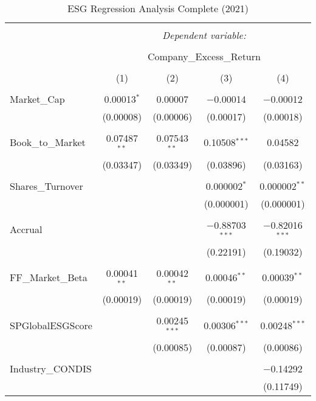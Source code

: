 
\begin{table}[!htbp] \centering 
  \caption{ESG Regression Analysis Complete (2021)} 
  \label{} 
\begin{tabular}{@{\extracolsep{5pt}}lcccc} 
\\[-1.8ex]\hline 
\hline \\[-1.8ex] 
 & \multicolumn{4}{c}{\textit{Dependent variable:}} \\ 
\cline{2-5} 
\\[-1.8ex] & \multicolumn{4}{c}{Company\_Excess\_Return} \\ 
\\[-1.8ex] & (1) & (2) & (3) & (4)\\ 
\hline \\[-1.8ex] 
 Market\_Cap & 0.00013$^{*}$ & 0.00007 & $-$0.00014 & $-$0.00012 \\ 
  & (0.00008) & (0.00006) & (0.00017) & (0.00018) \\ 
  & & & & \\ 
 Book\_to\_Market & 0.07487$^{**}$ & 0.07543$^{**}$ & 0.10508$^{***}$ & 0.04582 \\ 
  & (0.03347) & (0.03349) & (0.03896) & (0.03163) \\ 
  & & & & \\ 
 Shares\_Turnover &  &  & 0.000002$^{*}$ & 0.000002$^{**}$ \\ 
  &  &  & (0.000001) & (0.000001) \\ 
  & & & & \\ 
 Accrual &  &  & $-$0.88703$^{***}$ & $-$0.82016$^{***}$ \\ 
  &  &  & (0.22191) & (0.19032) \\ 
  & & & & \\ 
 FF\_Market\_Beta & 0.00041$^{**}$ & 0.00042$^{**}$ & 0.00046$^{**}$ & 0.00039$^{**}$ \\ 
  & (0.00019) & (0.00019) & (0.00019) & (0.00019) \\ 
  & & & & \\ 
 SPGlobalESGScore &  & 0.00245$^{***}$ & 0.00306$^{***}$ & 0.00248$^{***}$ \\ 
  &  & (0.00085) & (0.00087) & (0.00086) \\ 
  & & & & \\ 
 Industry\_CONDIS &  &  &  & $-$0.14292 \\ 
  &  &  &  & (0.11749) \\ 

\end{tabular}
\end{table}
